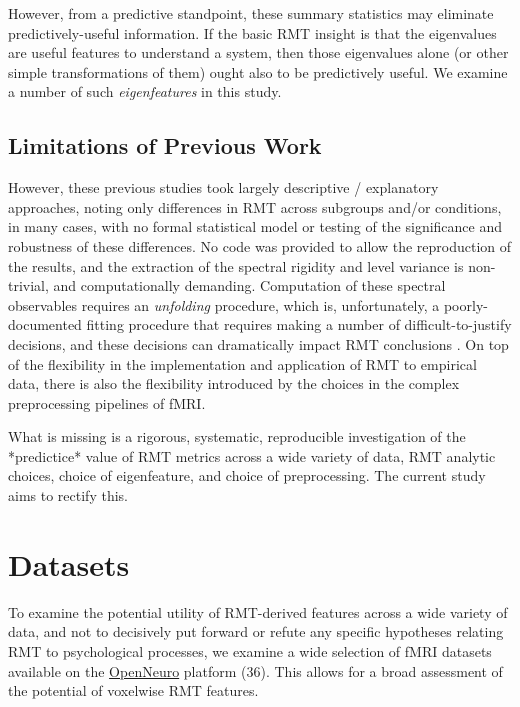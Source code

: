 \documentclass[12pt]{spieman}  %
\begin{document}
\begin{spacing}{2}
However, from a predictive standpoint, these summary statistics may eliminate predictively-useful
information. If the basic RMT insight is that the eigenvalues are useful features to understand a
system, then those eigenvalues alone (or other simple transformations of them) ought also to be
predictively useful. We examine a number of such \textit{eigenfeatures} in this study.


\subsection{Limitations of Previous Work}

However, these previous studies took largely descriptive / explanatory approaches, noting only
differences in RMT across subgroups and/or conditions, in many cases, with no formal statistical
model or testing of the significance and robustness of these differences. No code was provided to
allow the reproduction of the results, and the extraction of the spectral rigidity and level
variance is non-trivial, and computationally demanding. Computation of these spectral observables
requires an \textit{unfolding}
procedure\cite{guhrRandommatrixTheoriesQuantum1998a,mehtaRandomMatrices2004}, which is,
unfortunately, a poorly-documented fitting procedure that requires making a number of
difficult-to-justify decisions, and these decisions can dramatically impact RMT conclusions
\cite{abul-magdUnfoldingSpectrumChaotic2014,abueleninSpectralUnfoldingChaotic2018,fossionRandommatrixSpectraTime2013,abueleninEffectUnfoldingSpectral2012,moralesImprovedUnfoldingDetrending2011}.
On top of the flexibility in the implementation and application of RMT to empirical data, there
is also the flexibility introduced by the choices in the complex preprocessing pipelines of fMRI\cite{parkerBenefitSliceTiming2019}.

What is missing is a rigorous, systematic, reproducible investigation of the *predictice* value of
RMT metrics across a wide variety of data, RMT analytic choices, choice of eigenfeature, and choice
of preprocessing. The current study aims to rectify this.


\section{Datasets}

To examine the potential utility of RMT-derived features across a wide
variety of data, and not to decisively put forward or refute any specific hypotheses relating RMT to
psychological processes, we examine a wide selection of fMRI datasets available on the
\href{https://openneuro.org/}{OpenNeuro} platform (36).  This allows for a broad assessment of the
potential of voxelwise RMT features.


\end{spacing}
\end{document}
